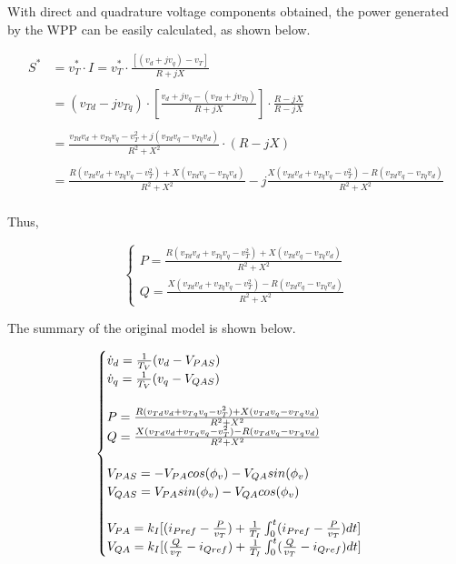 With direct and quadrature voltage components obtained, the power generated by the WPP can be easily calculated, as shown below.

\begin{align*}
		S^{*} &= v_{T}^{*} \cdot I = v_{T}^{*} \cdot \frac{[(v_{d} + jv_{q}) - v_{T}]}{R + jX} \\
		\\
		&= (v_{Td} - jv_{Tq})\cdot\left[\frac{v_{d} + jv_{q} - (v_{Td} + jv_{Tq})}{R + jX}\right]\cdot \frac{R - jX}{R - jX} \\
		\\
		&= \frac{v_{Td}v_{d} + v_{Tq}v_{q} - v_{T}^{2} + j(v_{Td}v_{q} - v_{Tq}v_{d})}{R^{2} + X^{2}}\cdot (R - jX) \\
		\\
		&= \frac{R(v_{Td}v_{d} + v_{Tq}v_{q} - v_{T}^{2}) + X(v_{Td}v_{q} - v_{Tq}v_{d})}{R^{2} + X^{2}} - j\frac{X(v_{Td}v_{d} + v_{Tq}v_{q} - v_{T}^{2}) - R(v_{Td}v_{q} - v_{Tq}v_{d})}{R^{2} + X^{2}} \\
\end{align*}

Thus,

\begin{equation}
	\begin{cases}
		P = \frac{R(v_{Td}v_{d} + v_{Tq}v_{q} - v_{T}^{2}) + X(v_{Td}v_{q} - v_{Tq}v_{d})}{R^{2} + X^{2}} \\
		Q = \frac{X(v_{Td}v_{d} + v_{Tq}v_{q} - v_{T}^{2}) - R(v_{Td}v_{q} - v_{Tq}v_{d})}{R^{2} + X^{2}}
	\end{cases}
	\label{eq: Outputs}
\end{equation}

The summary of the original model is shown below.

\begin{equation}
	\begin{cases}
		\dot{v}_{d} = \frac{1}{T_{V}}(v_{d} - V_{PAS}) \\
		\dot{v}_{q} = \frac{1}{T_{V}}(v_{q} - V_{QAS}) \\
		\\
		P = \frac{R(v_{Td}v_{d} + v_{Tq}v_{q} - v_{T}^{2}) + X(v_{Td}v_{q} - v_{Tq}v_{d})}{R^{2} + X^{2}} \\
		Q = \frac{X(v_{Td}v_{d} + v_{Tq}v_{q} - v_{T}^{2}) - R(v_{Td}v_{q} - v_{Tq}v_{d})}{R^{2} + X^{2}} \\
		\\
		V_{PAS} = -V_{PA}cos(\phi_{v}) - V_{QA}sin(\phi_{v}) \\
		V_{QAS} = V_{PA}sin(\phi_{v}) - V_{QA}cos(\phi_{v}) \\
		\\
		V_{PA} = k_{I}[(i_{Pref} - \frac{P}{v_{T}}) + \frac{1}{T_{I}}\int\displaylimits_{0}^{t} (i_{Pref} - \frac{P}{v_{T}})dt]\\
		V_{QA} = k_{I}[(\frac{Q}{v_{T}} - i_{Qref}) + \frac{1}{T_{I}}\int\displaylimits_{0}^{t} (\frac{Q}{v_{T}} - i_{Qref})dt]
	\end{cases}
	\label{eq: Summary}
\end{equation}

